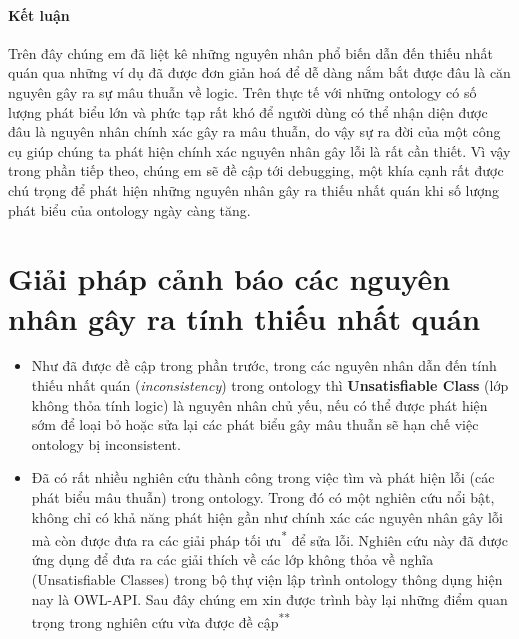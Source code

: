 \paragraph{Kết luận}
Trên đây chúng em đã liệt kê những nguyên nhân phổ biến dẫn đến thiếu nhất quán qua những ví dụ đã được đơn giản hoá để dễ dàng nắm bắt được đâu là căn nguyên gây ra sự mâu thuẫn về logic. Trên thực tế với những ontology có số lượng phát biểu lớn và phức tạp rất khó để người dùng có thể nhận diện được đâu là nguyên nhân chính xác gây ra mâu thuẫn, do vậy sự ra đời của một công cụ giúp chúng ta phát hiện chính xác nguyên nhân gây lỗi là rất cần thiết. Vì vậy trong phần tiếp theo, chúng em sẽ đề cập tới debugging, một khía cạnh rất được chú trọng để phát hiện những nguyên nhân gây ra thiếu nhất quán khi số lượng phát biểu của ontology ngày càng tăng.

\section{Giải pháp cảnh báo các nguyên nhân gây ra tính thiếu nhất quán}
{
	\let\thefootnote\relax{}		
	\let\thefootnote\relax{}
}
\begin{itemize}
\item Như đã được đề cập trong phần trước, trong các nguyên nhân dẫn đến tính thiếu nhất quán (\textit{inconsistency}) trong ontology thì \textbf{Unsatisfiable Class} (lớp không thỏa tính logic) là nguyên nhân chủ yếu, nếu có thể được phát hiện sớm để loại bỏ hoặc sửa lại các phát biểu gây mâu thuẫn sẽ hạn chế việc ontology bị inconsistent.
\item Đã có rất nhiều nghiên cứu thành công trong việc tìm và phát hiện lỗi (các phát biểu mâu thuẫn) trong ontology. Trong đó có một nghiên cứu nổi bật\cite{repair}, không chỉ có khả năng phát hiện gần như chính xác các nguyên nhân gây lỗi mà còn được đưa ra các giải pháp tối ưu\textsuperscript{*} để sửa lỗi. Nghiên cứu này đã được ứng dụng để đưa ra các giải thích về các lớp không thỏa về nghĩa (Unsatisfiable Classes) trong bộ thự viện lập trình ontology thông dụng hiện nay là OWL-API\cite{owlapi}. Sau đây chúng em xin được trình bày lại những điểm quan trọng trong nghiên cứu vừa được đề cập\textsuperscript{**}
\end{itemize}


